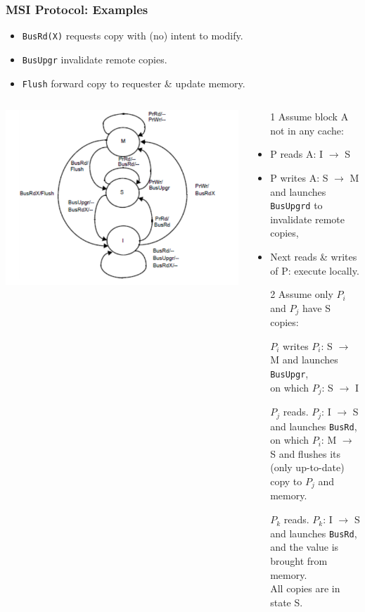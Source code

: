 \documentclass{beamer}
\renewcommand{\emph}[1]{\textcolor{structure}{#1}}
\begin{document}
\begin{frame}[fragile,t]
\frametitle{MSI Protocol: Examples}

\begin{itemize}
    \item \emph{\tt BusRd(X)} requests copy with (no) intent to modify.
    \item \emph{\tt BusUpgr} invalidate remote copies.  
    \item \emph{\tt Flush} forward copy to requester \& update memory.
\end{itemize} 


\begin{columns}\hspace{-7ex}
\includegraphics[width=40ex]{Figures/FigsInfCoherence/MSI}
\begin{scriptsize}
\begin{itemize}
    \item[1] \emph{Assume block A not in any cache:}
    \item P reads A: I $\rightarrow$ S
    \item P writes A: S $\rightarrow$ M and launches {\tt BusUpgrd} to invalidate remote copies,  
    \item Next reads \& writes of P: execute locally.\medskip

    \item[2] \emph{Assume only $P_i$ and $P_j$ have S copies:}
    \item[$P_i$ writes] $P_i$: S $\rightarrow$ M and launches {\tt BusUpgr},\\
                        on which $P_j$: S $\rightarrow$ I
    \item[$P_j$ reads.]  $P_j$: I $\rightarrow$ S and launches {\tt BusRd},\\
                         on which $P_i$: M $\rightarrow$ S and flushes its\\
                        (only up-to-date) copy to $P_j$ and memory.
    \item[$P_k$ reads.] $P_k$: I $\rightarrow$ S and launches {\tt BusRd},\\
                        and the value is brought from memory.\\ 
                        All copies are in state S.
\end{itemize}
\end{scriptsize}
\end{columns}

\end{frame}
\end{document}
